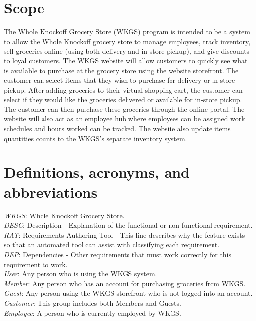 \documentclass{scrreprt}
\theoremstyle{funreq}
\begin{document}
\section{Scope}
The Whole Knockoff Grocery Store (WKGS) program is intended to be a system to allow the Whole Knockoff grocery store to manage employees, track inventory, sell groceries online (using both delivery and in-store pickup), and give discounts to loyal customers.  The WKGS website will allow customers to quickly see what is available to purchase at the grocery store using the website storefront.  The customer can select items that they wish to purchase for delivery or in-store pickup.  After adding groceries to their virtual shopping cart, the customer can select if they would like the groceries delivered or available for in-store pickup.  The customer can then purchase these groceries through the online portal.  The website will also act as an employee hub where employees can be assigned work schedules and hours worked can be tracked.  The website also update items quantities counts to the WKGS's separate inventory system.

\section{Definitions, acronyms, and abbreviations}
\textit{WKGS}: Whole Knockoff Grocery Store.\\
\textit{DESC}: Description - Explanation of the functional or non-functional requirement.\\
\textit{RAT}: Requirements Authoring Tool - This line describes why the feature exists so that an automated tool can assist with classifying each requirement.\\
\textit{DEP}: Dependencies - Other requirements that must work correctly for this requirement to work.\\
\textit{User}: Any person who is using the WKGS system.\\
\textit{Member}: Any person who has an account for purchasing groceries from WKGS.\\
\textit{Guest}: Any person using the WKGS storefront who is not logged into an account.\\
\textit{Customer}: This group includes both Members and Guests.\\
\textit{Employee}: A person who is currently employed by WKGS.\\
\end{document}
